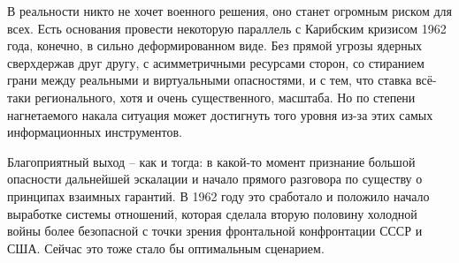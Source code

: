 В реальности никто не хочет военного решения, оно станет огромным риском для
всех. Есть основания провести некоторую параллель с Карибским кризисом 1962
года, конечно, в сильно деформированном виде. Без прямой угрозы ядерных
сверхдержав друг другу, с асимметричными ресурсами сторон, со стиранием грани
между реальными и виртуальными опасностями, и с тем, что ставка всё-таки
регионального, хотя и очень существенного, масштаба. Но по степени нагнетаемого
накала ситуация может достигнуть того уровня из-за этих самых информационных
инструментов. 

Благоприятный выход – как и тогда: в какой-то момент признание большой
опасности дальнейшей эскалации и начало прямого разговора по существу о
принципах взаимных гарантий. В 1962 году это сработало и положило начало
выработке системы отношений, которая сделала вторую половину холодной войны
более безопасной с точки зрения фронтальной конфронтации СССР и США. Сейчас это
тоже стало бы оптимальным сценарием.
